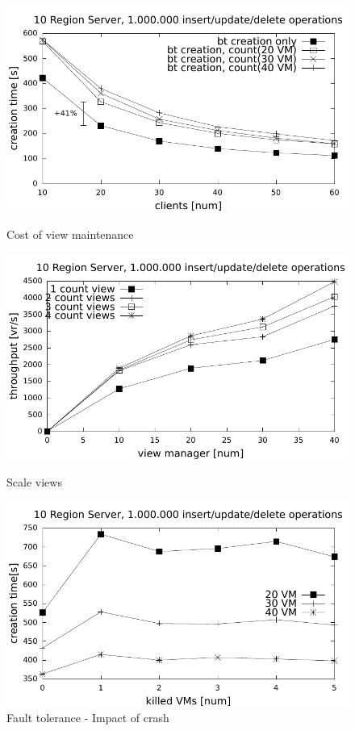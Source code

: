 \begin{figure}
  \includegraphics[width=\linewidth]{figures/cost}
      \vspace{-5mm}
  \caption{Cost of view maintenance}\label{fig:cost}
      \vspace{-5mm}
\endminipage\hfill
{}
  \includegraphics[width=\linewidth]{figures/scale_views}
      \vspace{-5mm}
  \caption{Scale views}\label{fig:views}
      \vspace{-5mm}
\endminipage\hfill
{}%
  \includegraphics[width=\linewidth]{figures/killvm}
      \vspace{-5mm}
  \caption{Fault tolerance - Impact of crash}\label{fig:killvm}
      \vspace{-5mm}
\endminipage
\end{figure}


